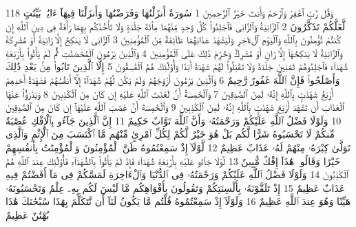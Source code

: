 {\tiny\colorbox{cl_aya}{118}} وَقُل رَّبِّ ٱغْفِرْ وَٱرْحَمْ وَأَنتَ خَيْرُ ٱلرَّٰحِمِينَ
{\tiny\colorbox{cl_aya}{1}} سُورَةٌ أَنزَلْنَٰهَا وَفَرَضْنَٰهَا وَأَنزَلْنَا فِيهَآ ءَايَٰتٍۭ بَيِّنَٰتٍ لَّعَلَّكُمْ تَذَكَّرُونَ
{\tiny\colorbox{cl_aya}{2}} ٱلزَّانِيَةُ وَٱلزَّانِى فَٱجْلِدُوا۟ كُلَّ وَٰحِدٍ مِّنْهُمَا مِا۟ئَةَ جَلْدَةٍ وَلَا تَأْخُذْكُم بِهِمَا رَأْفَةٌ فِى دِينِ ٱللَّهِ إِن كُنتُمْ تُؤْمِنُونَ بِٱللَّهِ وَٱلْيَوْمِ ٱلْءَاخِرِ وَلْيَشْهَدْ عَذَابَهُمَا طَآئِفَةٌ مِّنَ ٱلْمُؤْمِنِينَ
{\tiny\colorbox{cl_aya}{3}} ٱلزَّانِى لَا يَنكِحُ إِلَّا زَانِيَةً أَوْ مُشْرِكَةً وَٱلزَّانِيَةُ لَا يَنكِحُهَآ إِلَّا زَانٍ أَوْ مُشْرِكٌ وَحُرِّمَ ذَٰلِكَ عَلَى ٱلْمُؤْمِنِينَ
{\tiny\colorbox{cl_aya}{4}} وَٱلَّذِينَ يَرْمُونَ ٱلْمُحْصَنَٰتِ ثُمَّ لَمْ يَأْتُوا۟ بِأَرْبَعَةِ شُهَدَآءَ فَٱجْلِدُوهُمْ ثَمَٰنِينَ جَلْدَةً وَلَا تَقْبَلُوا۟ لَهُمْ شَهَٰدَةً أَبَدًا وَأُو۟لَٰٓئِكَ هُمُ ٱلْفَٰسِقُونَ
{\tiny\colorbox{cl_aya}{5}} إِلَّا ٱلَّذِينَ تَابُوا۟ مِنۢ بَعْدِ ذَٰلِكَ وَأَصْلَحُوا۟ فَإِنَّ ٱللَّهَ غَفُورٌ رَّحِيمٌ
{\tiny\colorbox{cl_aya}{6}} وَٱلَّذِينَ يَرْمُونَ أَزْوَٰجَهُمْ وَلَمْ يَكُن لَّهُمْ شُهَدَآءُ إِلَّآ أَنفُسُهُمْ فَشَهَٰدَةُ أَحَدِهِمْ أَرْبَعُ شَهَٰدَٰتٍۭ بِٱللَّهِ إِنَّهُۥ لَمِنَ ٱلصَّٰدِقِينَ
{\tiny\colorbox{cl_aya}{7}} وَٱلْخَٰمِسَةُ أَنَّ لَعْنَتَ ٱللَّهِ عَلَيْهِ إِن كَانَ مِنَ ٱلْكَٰذِبِينَ
{\tiny\colorbox{cl_aya}{8}} وَيَدْرَؤُا۟ عَنْهَا ٱلْعَذَابَ أَن تَشْهَدَ أَرْبَعَ شَهَٰدَٰتٍۭ بِٱللَّهِ إِنَّهُۥ لَمِنَ ٱلْكَٰذِبِينَ
{\tiny\colorbox{cl_aya}{9}} وَٱلْخَٰمِسَةَ أَنَّ غَضَبَ ٱللَّهِ عَلَيْهَآ إِن كَانَ مِنَ ٱلصَّٰدِقِينَ
{\tiny\colorbox{cl_aya}{10}} وَلَوْلَا فَضْلُ ٱللَّهِ عَلَيْكُمْ وَرَحْمَتُهُۥ وَأَنَّ ٱللَّهَ تَوَّابٌ حَكِيمٌ
{\tiny\colorbox{cl_aya}{11}} إِنَّ ٱلَّذِينَ جَآءُو بِٱلْإِفْكِ عُصْبَةٌ مِّنكُمْ لَا تَحْسَبُوهُ شَرًّا لَّكُم بَلْ هُوَ خَيْرٌ لَّكُمْ لِكُلِّ ٱمْرِئٍ مِّنْهُم مَّا ٱكْتَسَبَ مِنَ ٱلْإِثْمِ وَٱلَّذِى تَوَلَّىٰ كِبْرَهُۥ مِنْهُمْ لَهُۥ عَذَابٌ عَظِيمٌ
{\tiny\colorbox{cl_aya}{12}} لَّوْلَآ إِذْ سَمِعْتُمُوهُ ظَنَّ ٱلْمُؤْمِنُونَ وَٱلْمُؤْمِنَٰتُ بِأَنفُسِهِمْ خَيْرًا وَقَالُوا۟ هَٰذَآ إِفْكٌ مُّبِينٌ
{\tiny\colorbox{cl_aya}{13}} لَّوْلَا جَآءُو عَلَيْهِ بِأَرْبَعَةِ شُهَدَآءَ فَإِذْ لَمْ يَأْتُوا۟ بِٱلشُّهَدَآءِ فَأُو۟لَٰٓئِكَ عِندَ ٱللَّهِ هُمُ ٱلْكَٰذِبُونَ
{\tiny\colorbox{cl_aya}{14}} وَلَوْلَا فَضْلُ ٱللَّهِ عَلَيْكُمْ وَرَحْمَتُهُۥ فِى ٱلدُّنْيَا وَٱلْءَاخِرَةِ لَمَسَّكُمْ فِى مَآ أَفَضْتُمْ فِيهِ عَذَابٌ عَظِيمٌ
{\tiny\colorbox{cl_aya}{15}} إِذْ تَلَقَّوْنَهُۥ بِأَلْسِنَتِكُمْ وَتَقُولُونَ بِأَفْوَاهِكُم مَّا لَيْسَ لَكُم بِهِۦ عِلْمٌ وَتَحْسَبُونَهُۥ هَيِّنًا وَهُوَ عِندَ ٱللَّهِ عَظِيمٌ
{\tiny\colorbox{cl_aya}{16}} وَلَوْلَآ إِذْ سَمِعْتُمُوهُ قُلْتُم مَّا يَكُونُ لَنَآ أَن نَّتَكَلَّمَ بِهَٰذَا سُبْحَٰنَكَ هَٰذَا بُهْتَٰنٌ عَظِيمٌ
